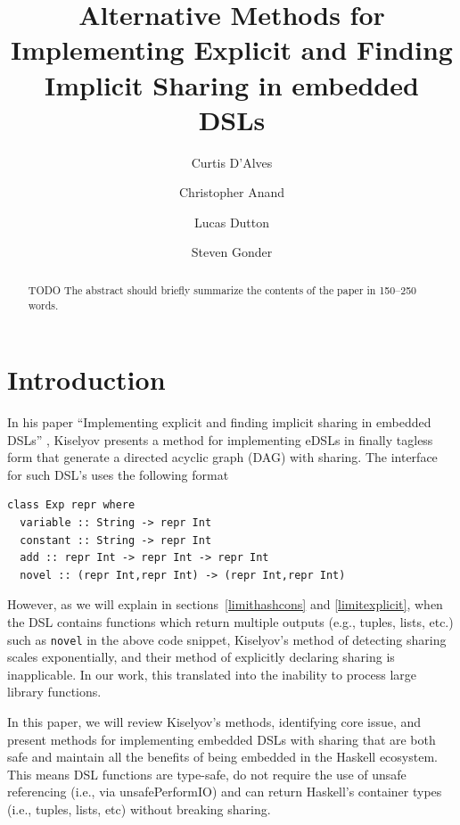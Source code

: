 \documentclass[runningheads]{llncs}
\begin{document}
\lstset{language=haskell}
%
\title{Alternative Methods for Implementing
    Explicit and Finding Implicit Sharing in embedded DSLs}
%
%
\author{Curtis D'Alves \and
Christopher Anand \and
Lucas Dutton \and
Steven Gonder
}
%
%
%
\maketitle              %
%
\begin{abstract}
TODO The abstract should briefly summarize the contents of the paper in
150--250 words.

\end{abstract}
%
%
%
\section{Introduction}

In his paper ``Implementing explicit and finding implicit sharing in embedded
DSLs'' \cite{kiselyov:sharing}, Kiselyov presents a method for implementing
eDSLs in finally tagless form that generate a directed acyclic graph (DAG) with
sharing. The interface for such DSL's uses the following format
\begin{verbatim}
class Exp repr where
  variable :: String -> repr Int
  constant :: String -> repr Int
  add :: repr Int -> repr Int -> repr Int
  novel :: (repr Int,repr Int) -> (repr Int,repr Int)
\end{verbatim}
However, as we will explain in sections~\ref{limithashcons} and
\ref{limitexplicit}, when the DSL contains functions which return multiple
outputs (e.g., tuples, lists, etc.) such as \texttt{novel} in the
above code snippet, Kiselyov's method of detecting sharing scales exponentially,
and their method of explicitly declaring sharing is inapplicable. In our work,
this translated into the inability to process large library functions.

In this paper, we will review Kiselyov's methods, identifying core issue, and
present methods for implementing embedded DSLs with sharing that are both safe
and maintain all the benefits of being embedded in the Haskell ecosystem. This
means DSL functions are type-safe, do not require the use of unsafe referencing
(i.e., via unsafePerformIO) and can return Haskell's container types (i.e.,
tuples, lists, etc) without breaking sharing.
\end{document}
